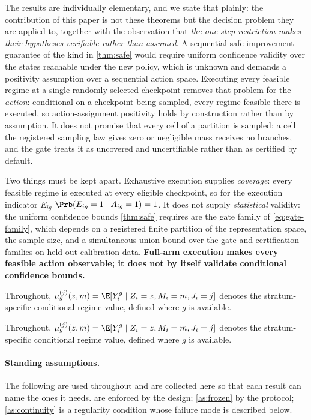 The results are individually elementary, and we state that plainly: the
contribution of this paper is not these theorems but the decision problem they
are applied to, together with the observation that
\emph{the one-step restriction makes their hypotheses verifiable rather than
assumed}.  A sequential safe-improvement guarantee of the kind in
\cref{thm:safe} would require uniform confidence validity over the states
reachable under the new policy, which is unknown and demands a positivity
assumption over a sequential action space.  Executing every feasible regime at a
single randomly selected checkpoint removes that problem for the
\emph{action}: conditional on a checkpoint being sampled, every regime feasible
there is executed, so action-assignment positivity holds by construction rather
than by assumption.  It does not promise that every cell of a partition is
sampled: a cell the registered sampling law gives zero or negligible mass
receives no branches, and the gate treats it as uncovered and uncertifiable
rather than as certified by default.

Two things must be kept apart.  Exhaustive execution supplies
\emph{coverage}: every feasible regime is executed at every eligible checkpoint,
so for the execution indicator $E_{ig}$ $\Prb(E_{ig}=1\mid A_{ig}=1)=1$.  It does
not supply \emph{statistical} validity: the uniform confidence bounds
\cref{thm:safe} requires are the gate family of \cref{eq:gate-family}, which
depends on a registered finite partition of the representation space, the sample
size, and a simultaneous union bound over the gate and certification families on
held-out calibration data.  \textbf{Full-arm execution makes every feasible
action observable; it does not by itself validate conditional confidence
bounds.}

Throughout, $\mu^{(j)}_g(z,m)=\E[Y^g_i\mid Z_i=z,M_i=m,J_i=j]$ denotes the
stratum-specific conditional regime value, defined where $g$ is available.


Throughout, $\mu^{(j)}_g(z,m)=\E[Y^g_i\mid Z_i=z,M_i=m,J_i=j]$ denotes the
stratum-specific conditional regime value, defined where $g$ is available.

\paragraph{Standing assumptions.}
The following are used throughout and are collected here so that each result can
name the ones it needs.   are enforced by the design;
\cref{as:frozen} by the protocol; \cref{as:continuity} is a regularity condition
whose failure mode is described below.

